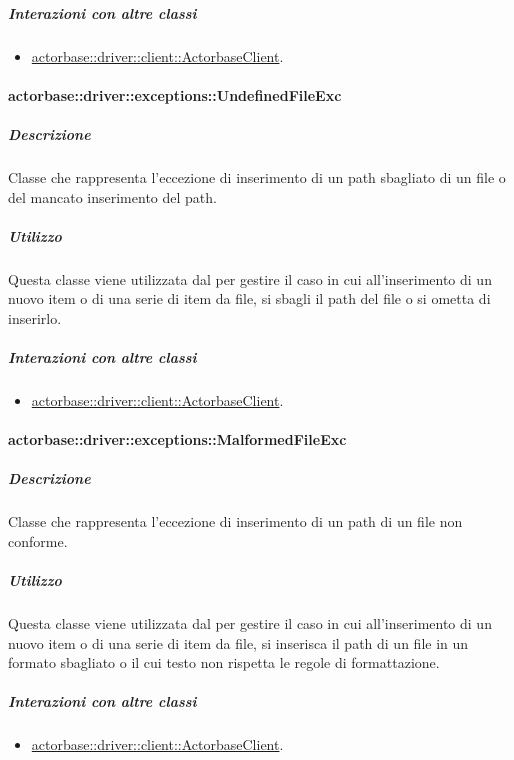\documentclass{scalatekids-article}
\begin{document}
\subparagraph{Interazioni con altre classi}

\begin{itemize}
\item \hyperref[sec:actorbase::driver::client::ActorbaseClient]{actorbase::driver::client::ActorbaseClient}.
\end{itemize}

\paragraph{actorbase::driver::exceptions::UndefinedFileExc}

\subparagraph{Descrizione}

Classe che rappresenta l'eccezione di inserimento di un path sbagliato di un file o del mancato inserimento del path.

\subparagraph{Utilizzo}

Questa classe viene utilizzata dal  per gestire il caso in cui all'inserimento di un nuovo item o di una serie di item da file, si sbagli il path del file o si ometta di inserirlo.

\subparagraph{Interazioni con altre classi}

\begin{itemize}
\item \hyperref[sec:actorbase::driver::client::ActorbaseClient]{actorbase::driver::client::ActorbaseClient}.
\end{itemize}

\paragraph{actorbase::driver::exceptions::MalformedFileExc}

\subparagraph{Descrizione}

Classe che rappresenta l'eccezione di inserimento di un path di un file non conforme.

\subparagraph{Utilizzo}

Questa classe viene utilizzata dal  per gestire il caso in cui all'inserimento di un nuovo item o di una serie di item da file, si inserisca il path di un file in un formato sbagliato o il cui testo non rispetta le regole di formattazione.

\subparagraph{Interazioni con altre classi}

\begin{itemize}
\item \hyperref[sec:actorbase::driver::client::ActorbaseClient]{actorbase::driver::client::ActorbaseClient}.
\end{itemize}
\end{document}
